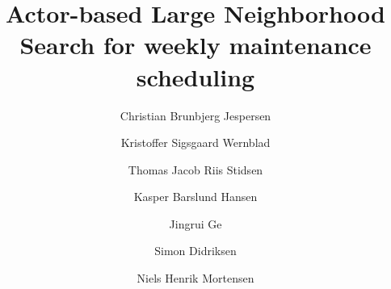 \documentclass[preprint,12pt,authoryear]{elsarticle}
\begin{document}
\begin{frontmatter}



\title{Actor-based Large Neighborhood Search for weekly maintenance scheduling} %


\author{Christian Brunbjerg Jespersen} %
\author{Kristoffer Sigsgaard Wernblad}
\author{Thomas Jacob Riis Stidsen}
\author{Kasper Barslund Hansen}
\author{Jingrui Ge}
\author{Simon Didriksen}
\author{Niels Henrik Mortensen}


\end{frontmatter}
\end{document}
